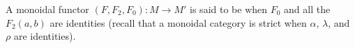 A monoidal functor $(F, F_2, F_0) : M \rightarrow M'$ is said to be  when $F_0$ and all the $F_2(a, b)$ are identities (recall that a monoidal category is strict when $\alpha$, $\lambda$, and $\rho$ are identities).
